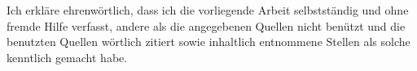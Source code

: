 Ich erkläre ehrenwörtlich, dass ich die vorliegende Arbeit 
selbstständig und ohne fremde Hilfe verfasst, andere als 
die angegebenen Quellen nicht benützt und die benutzten 
Quellen wörtlich zitiert sowie inhaltlich entnommene Stellen 
als solche kenntlich gemacht habe.